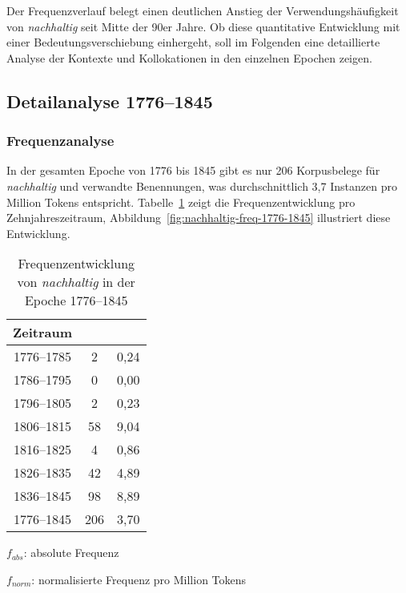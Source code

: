 \documentclass[
    german,
    a4paper,%
    12pt,%
    oneside,%
    toc=bibliography,
    final,
]{scrartcl}
\begin{document}
Der Frequenzverlauf belegt einen deutlichen Anstieg der Verwendungshäufigkeit von \textit{nachhaltig} seit Mitte der 90er Jahre. Ob diese quantitative Entwicklung mit einer Bedeutungsverschiebung einhergeht, soll im Folgenden eine detaillierte Analyse der Kontexte und Kollokationen in den einzelnen Epochen zeigen.

\subsection{Detailanalyse 1776–1845}
\label{subsec:detail-1776–1845}

\subsubsection{Frequenzanalyse}

In der gesamten Epoche von 1776 bis 1845 gibt es nur 206 Korpusbelege für \textit{nachhaltig} und verwandte Benennungen, was durchschnittlich 3,7 Instanzen pro Million Tokens entspricht. Tabelle~\ref{tab:freq-epoche1} zeigt die Frequenzentwicklung pro Zehnjahreszeitraum, Abbildung~\ref{fig:nachhaltig-freq-1776-1845} illustriert diese Entwicklung.

\begin{table}[h!]
	\centering
	\renewcommand{\arraystretch}{1.5}
	
	\caption{Frequenzentwicklung von \textit{nachhaltig} in der Epoche 1776–1845}
	\label{tab:freq-epoche1}
	
	\begin{threeparttable}
	
	\begin{tabular}{ccc}
	\textbf{Zeitraum} & \boldmath{$f_{abs}$} & \boldmath{$f_{norm}$} \\ \hline
	1776–1785 & 2 & 0,24 \\ \hline
	1786–1795 & 0 & 0,00 \\ \hline
	1796–1805 & 2 & 0,23 \\ \hline
	1806–1815 & 58 & 9,04 \\ \hline
	1816–1825 & 4 & 0,86 \\ \hline
	1826–1835 & 42 & 4,89 \\ \hline
	1836–1845 & 98 & 8,89 \\ \hline\hline
	1776–1845 & 206 & 3,70 \\ \hline
	\end{tabular} 
	
	\begin{tablenotes}
	\footnotesize
	\setlength{\itemindent}{-1.2em}
	\item $f_{abs}$: absolute Frequenz
	\item $f_{norm}$: normalisierte Frequenz pro Million Tokens
	\end{tablenotes}
	
	\end{threeparttable}
\end{table}
\end{document}
